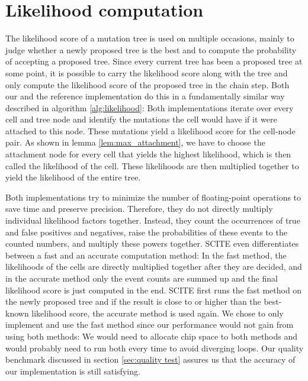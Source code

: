 \section{Likelihood computation}
\label{sec:scoring}

The likelihood score of a mutation tree is used on multiple occasions, mainly to judge whether a newly proposed tree is the best and to compute the probability of accepting a proposed tree. Since every current tree has been a proposed tree at some point, it is possible to carry the likelihood score along with the tree and only compute the likelihood score of the proposed tree in the chain step. Both our and the reference implementation do this in a fundamentally similar way described in algorithm \ref{alg:likelihood}: Both implementations iterate over every cell and tree node and identify the mutations the cell would have if it were attached to this node. These mutations yield a likelihood score for the cell-node pair. As shown in lemma \ref{lem:max_attachment}, we have to choose the attachment node for every cell that yields the highest likelihood, which is then called the likelihood of the cell. These likelihoods are then multiplied together to yield the likelihood of the entire tree.

Both implementations try to minimize the number of floating-point operations to save time and preserve precision. Therefore, they do not directly multiply individual likelihood factors together. Instead, they count the occurrences of true and false positives and negatives, raise the probabilities of these events to the counted numbers, and multiply these powers together. \ac{SCITE} even differentiates between a fast and an accurate computation method: In the fast method, the likelihoods of the cells are directly multiplied together after they are decided, and in the accurate method only the event counts are summed up and the final likelihood score is just computed in the end. \ac{SCITE} first runs the fast method on the newly proposed tree and if the result is close to or higher than the best-known likelihood score, the accurate method is used again. We chose to only implement and use the fast method since our performance would not gain from using both methods: We would need to allocate chip space to both methods and would probably need to run both every time to avoid diverging loops. Our quality benchmark discussed in section \ref{sec:quality test} assures us that the accuracy of our implementation is still satisfying.

